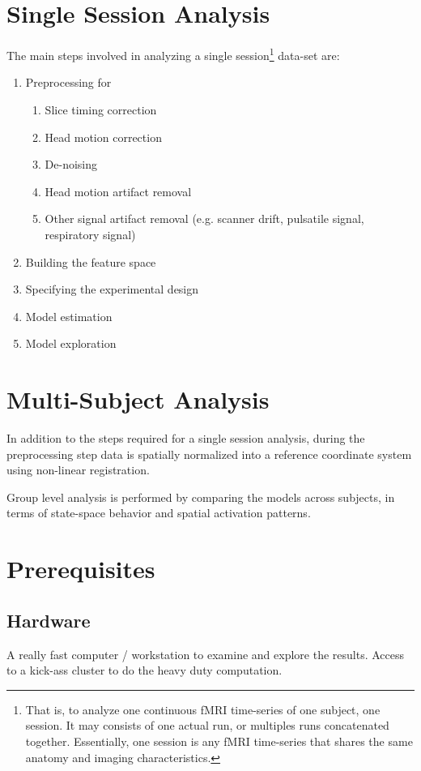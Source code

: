 \documentclass[12pt,twoside]{article}
\begin{document}
\section{Single Session Analysis}
The main steps involved in analyzing a single session\footnote{That
is, to analyze one continuous fMRI time-series of one subject, one
session. It may consists of one actual run, or multiples runs
concatenated together. Essentially, one session is any fMRI
time-series that shares the same anatomy and imaging
characteristics.} data-set are:
\begin{enumerate}[i]
  \item Preprocessing for
  \begin{enumerate}
    \item Slice timing correction
    \item Head motion correction
    \item De-noising
    \item Head motion artifact removal
    \item Other signal artifact removal (e.g. scanner drift, pulsatile signal, respiratory signal)
  \end{enumerate}
  \item Building the feature space
  \item Specifying the experimental design
  \item Model estimation
  \item Model exploration
\end{enumerate}

\section{Multi-Subject Analysis}
In addition to the steps required for a single session analysis,
during the preprocessing step  data is spatially normalized into a
reference coordinate system using non-linear registration.

Group level analysis is performed by comparing the models across
subjects, in terms of state-space behavior and spatial activation
patterns.

\section{Prerequisites}

\subsection{Hardware}
A really fast computer / workstation to examine and explore the
results. Access to a kick-ass cluster to do the heavy duty
computation.
\end{document}
